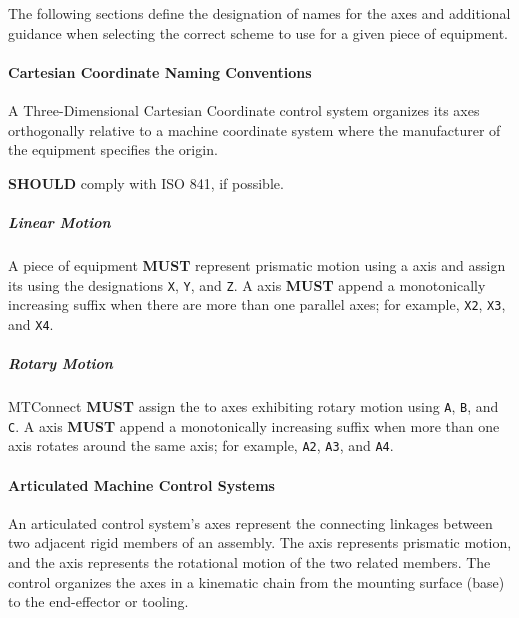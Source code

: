 The following sections define the designation of names for the axes and additional guidance when selecting the correct scheme to use for a given piece of equipment.

\paragraph{Cartesian Coordinate Naming Conventions}
\label{sec:Cartesian Coordinate Naming Conventions}

A Three-Dimensional Cartesian Coordinate control system organizes its axes orthogonally relative to a machine coordinate system where the manufacturer of the equipment specifies the origin. 

  \textbf{SHOULD} comply with ISO 841, if possible.

\subparagraph{Linear Motion}\mbox{}
\label{sec:Linear Motion}

A piece of equipment \textbf{MUST} represent prismatic motion using a  axis  and assign its  using the designations \texttt{X}, \texttt{Y}, and \texttt{Z}. A  axis  \textbf{MUST} append a monotonically increasing suffix when there are more than one parallel axes; for example, \texttt{X2}, \texttt{X3}, and \texttt{X4}. 

\subparagraph{Rotary Motion}\mbox{}
\label{sec:Rotary Motion}

\gls{MTConnect} \textbf{MUST} assign the  to  axes exhibiting rotary motion using \texttt{A}, \texttt{B}, and \texttt{C}. A  axis  \textbf{MUST} append a monotonically increasing suffix when more than one  axis rotates around the same  axis; for example, \texttt{A2}, \texttt{A3}, and \texttt{A4}. 

\paragraph{Articulated Machine Control Systems}
\label{sec:Articulated Machine Control Systems}

An articulated control system's axes represent the connecting linkages between two adjacent rigid members of an assembly. The  axis represents prismatic motion, and the  axis represents the rotational motion of the two related members. The control organizes the axes in a kinematic chain from the mounting surface (base) to the end-effector or tooling.

